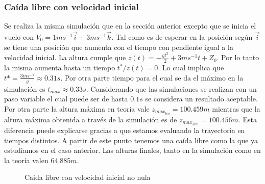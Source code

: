 \documentclass[main]{subfiles}
\begin{document}
\subsubsection{Ca\'ida libre con velocidad inicial}
Se realiza la misma simulaci\'on que en la secci\'on anterior excepto que se inicia el vuelo con $V_0 = 1ms^{-1}\vec{i}+3ms^{-1}\vec{k}$. Tal como es de esperar en la posici\'on seg\'un $\vec{i}$ se tiene una posici\'on que aumenta con el tiempo con pendiente igual a la velocidad inicial. La altura cumple que $z(t)=-\frac{gt^2}{2}+3ms^{-1}t+Z_0$. Por lo tanto la misma aumenta hasta un tiempo  $t^* / \dot{z(t)=0}$. Lo cual implica que $t*=\frac{3ms^{-1}}{g}\approx0.31s$. Por otra parte tiempo para el cual se da el m\'aximo en la simulaci\'on es $t_{max} \approx 0.33s$. Considerando que las simulaciones se realizan con un paso variable el cual puede ser de hasta $0.1s$ se considera un resultado aceptable. Por otra parte la altura m\'axima en teor\'ia vale $z_{max_{teo}}=100.459m$ mientras que la altura m\'axima obtenida a trav\'es de la simulaci\'on es de $z_{max_{sim}}=100.456m$. Esta diferencia puede explicarse gracias a que estamos evaluando la trayectoria en tiempos distintos. A partir de este punto tenemos una ca\'ida libre como la que ya estudiamos en el caso anterior. Las alturas finales, tanto en la simulaci\'on como en la teor\'ia valen $64.885m$.

\begin{figure} 
  \centering
 
  \caption{Caida libre con velocidad inicial no nula}
  \label{fig:caida_libre_vi}
\end{figure}
\end{document}
